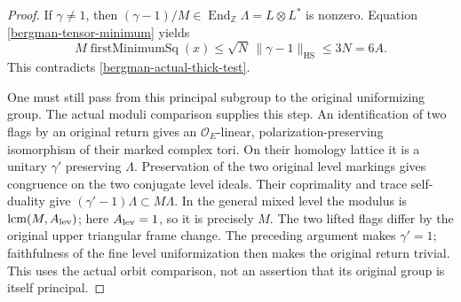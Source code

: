 \begin{proof}
If $\gamma\ne1$, then
$(\gamma-1)/M\in\operatorname{End}_{\mathbb Z}\Lambda=L\otimes L^*$
is nonzero.  Equation \eqref{bergman-tensor-minimum} yields
\[
 M\operatorname{firstMinimumSq}(x)
 \leq \sqrt N\,\|\gamma-1\|_{\mathrm{HS}}
 \leq3N=6A.
\]
This contradicts \eqref{bergman-actual-thick-test}.

One must still pass from this principal subgroup to the original
uniformizing group.  The actual moduli comparison supplies this step.
An identification of two flags by an original return gives an
$\mathcal O_E$-linear, polarization-preserving isomorphism of their
marked complex tori.  On their homology lattice it is a unitary
$\gamma'$ preserving $\Lambda$.  Preservation of the two original
level markings gives congruence on the two conjugate level ideals.
Their coprimality and trace self-duality give
$(\gamma'-1)\Lambda\subset M\Lambda$.  In the general mixed level the
modulus is $\operatorname{lcm}(M,A_{\rm lev})$; here
$A_{\rm lev}=1$, so it is precisely $M$.
The two lifted flags differ by the original upper triangular frame
change.  The preceding argument makes $\gamma'=1$; faithfulness of
the fine level uniformization then makes the original return trivial.
This uses the actual orbit comparison, not an assertion that its
original group is itself principal.\cite{bergman-thick-source}


\end{proof}
